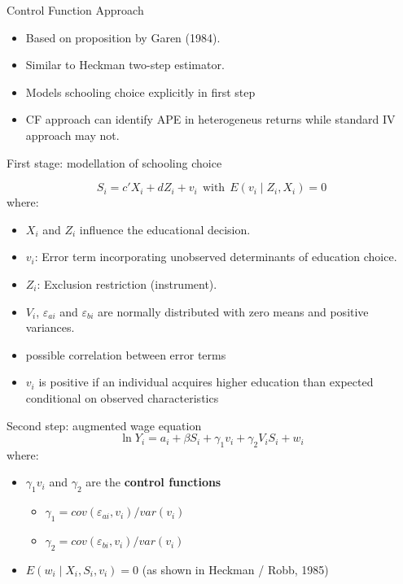 \documentclass[10pt,ignorenonframetext,]{beamer}
\providecommand{\tightlist}{%
  \setlength{\itemsep}{0pt}\setlength{\parskip}{0pt}}
\begin{document}
\begin{frame}[allowframebreaks]{Control Function Approach}
\protect\hypertarget{control-function-approach}{}

\begin{itemize}
\tightlist
\item
  Based on proposition by Garen (1984).
\item
  Similar to Heckman two-step estimator.
\item
  Models schooling choice explicitly in first step
\item
  CF approach can identify APE in heterogeneus returns while standard IV
  approach may not.
\end{itemize}

First stage: modellation of schooling choice

\[S_i = c'X_i + dZ_i + v_i ~~\text{with}~~ E(v_i \mid Z_i, X_i) = 0\]
where:

\begin{itemize}
\item
  \(X_i\) and \(Z_i\) influence the educational decision.
\item
  \(v_i\): Error term incorporating unobserved determinants of education
  choice.
\item
  \(Z_i\): Exclusion restriction (instrument).
\item
  \(V_i\), \(\varepsilon_{ai}\) and \(\varepsilon_{bi}\) are normally
  distributed with zero means and positive variances.
\item
  possible correlation between error terms
\item
  \(v_i\) is positive if an individual acquires higher education than
  expected conditional on observed characteristics
\end{itemize}

Second step: augmented wage equation
\[\ln Y_i = a_i + \beta S_i + \gamma_1 v_i + \gamma_2 V_iS_i + w_i
\] where:

\begin{itemize}
\item
  \(\gamma_1 v_i\) and \(\gamma_2\) are the \textbf{control functions}

  \begin{itemize}
  \item
    \(\gamma_1 = cov(\varepsilon_{ai}, v_i) /var(v_i)\)
  \item
    \(\gamma_2 = cov(\varepsilon_{bi}, v_i) /var(v_i)\)
  \end{itemize}
\item
  \(E(w_i \mid X_i, S_i, v_i) = 0\) (as shown in Heckman / Robb, 1985)
\end{itemize}


\end{frame}
\end{document}
